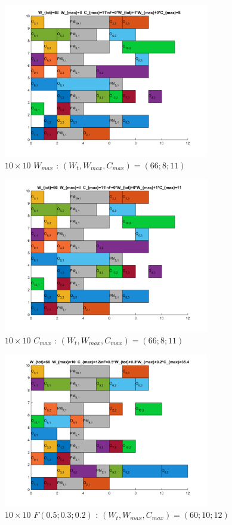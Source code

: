 \documentclass[10pt,a4paper]{scrartcl}
\begin{document}
\begin{figure}
  \centering
  \includegraphics[width=0.8\textwidth]{img/results10x10_Wmax.png}
  \caption{$10 \times 10$ $W_{max}$ : $(W_t, W_{max}, C_{max}) = (66; 8; 11)$}
\end{figure}
\begin{figure}
  \centering
  \includegraphics[width=0.8\textwidth]{img/results10x10_Cmax.png}
  \caption{$10 \times 10$ $C_{max}$ : $(W_t, W_{max}, C_{max}) = (66; 8; 11)$}
\end{figure}
\begin{figure}
  \centering
  \includegraphics[width=0.8\textwidth]{img/results10x10_F050302.png}
  \caption{$10 \times 10$ $F(0.5;0.3;0.2)$ : $(W_t, W_{max}, C_{max}) = (60; 10; 12)$}
\end{figure}
\end{document}
